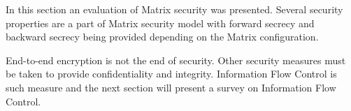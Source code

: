 In this section an evaluation of Matrix security was presented. Several security properties are a part of Matrix security model with forward secrecy and backward secrecy being provided depending on the Matrix configuration.

End-to-end encryption is not the end of security. Other security measures must be taken to provide confidentiality and integrity. Information Flow Control is such measure and the next section will present a survey on Information Flow Control.


\newpage











